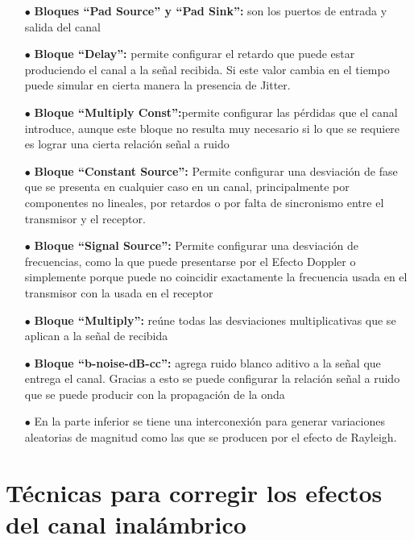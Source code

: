\begin{itemize}
	\item [$\bullet$] \textbf{Bloques “Pad Source” y “Pad Sink”:} son los puertos de entrada y salida del canal
	\item [$\bullet$] \textbf{Bloque “Delay”:} permite configurar el retardo que puede estar produciendo el canal a la señal recibida. Si este valor cambia en el tiempo puede simular en cierta manera la presencia de Jitter.
	\item [$\bullet$]\textbf{Bloque “Multiply Const”:}permite configurar las pérdidas que el canal introduce, aunque este bloque no resulta muy necesario si lo que se requiere es lograr una cierta relación señal a ruido 
	\item [$\bullet$]\textbf{Bloque “Constant Source”:}  Permite configurar una desviación de fase que se presenta en cualquier caso en un canal, principalmente por componentes no lineales, por retardos o por falta de sincronismo entre el transmisor y el receptor. 
	\item [$\bullet$] \textbf{Bloque “Signal Source”:} Permite configurar una desviación de frecuencias, como la que puede presentarse por el Efecto Doppler o simplemente porque puede no coincidir exactamente la frecuencia usada en el transmisor con la usada en el receptor
	\item [$\bullet$] \textbf{Bloque “Multiply”:}  reúne todas las desviaciones multiplicativas que se aplican a la señal de recibida
	\item [$\bullet$]\textbf{Bloque “b-noise-dB-cc”:} agrega ruido blanco aditivo a la señal que entrega el canal. Gracias a esto se puede configurar la relación señal a ruido que se puede producir con la propagación de la onda
	\item [$\bullet$] En la parte inferior se tiene una interconexión para generar variaciones aleatorias de magnitud como las que se producen por el efecto de Rayleigh. 
	
\end{itemize}

\section{Técnicas para corregir los efectos del canal inalámbrico}
